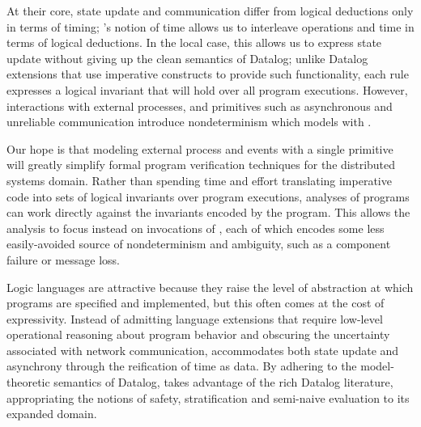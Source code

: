 
At their core, state update and communication differ from logical
deductions only in terms of timing; \lang's notion of time allows us
to interleave operations and time in terms of logical deductions.
In the local case, this allows us to express state update without giving up the clean semantics of Datalog; unlike
Datalog extensions that use imperative constructs to provide such
functionality, each \lang rule expresses a logical invariant that will
hold over all program executions.  
However, interactions with external processes, and primitives such as
asynchronous and unreliable communication introduce nondeterminism
which \lang models with .  

Our hope is that modeling external process and events with a single
primitive will greatly simplify formal program verification techniques for the distributed systems domain.  Rather
than spending time and effort translating imperative code into sets of logical
invariants over program executions, analyses of \lang programs can
work directly against the invariants encoded by the program.  This  allows
the analysis to focus instead on invocations of , each of which
encodes some less easily-avoided source of nondeterminism and
ambiguity, such as a component failure or message loss.

Logic languages are attractive because they raise the level of abstraction at which programs are specified
and implemented, but this often comes at the cost of expressivity.  Instead of admitting language extensions that require low-level 
operational reasoning about program behavior and obscuring the uncertainty associated with network communication, \lang 
accommodates both state update and asynchrony through the reification of time as data.  By adhering to the model-theoretic
semantics of Datalog, \lang takes advantage of the rich Datalog literature, appropriating the notions of safety, stratification
and semi-naive evaluation to its expanded domain.  




